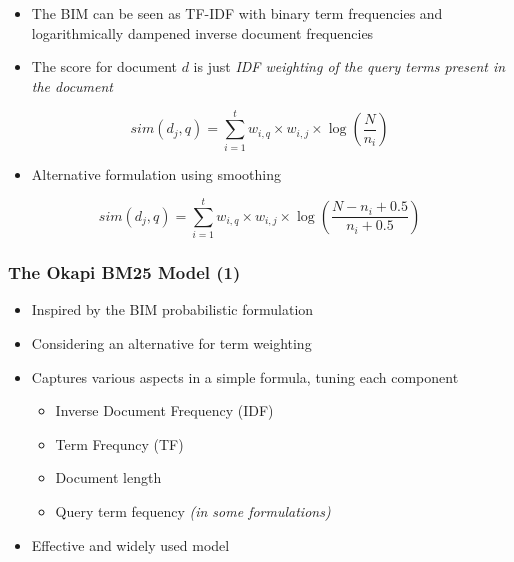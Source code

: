 \documentclass[svgnames]{beamer}
\begin{document}
\begin{frame}[allowframebreaks]
  \begin{block}{}
    \begin{itemize}
    \item The BIM can be seen as TF-IDF with binary term frequencies and logarithmically dampened inverse document frequencies
    \item The score for document $d$ is just \emph{IDF weighting of the query terms present in the document}
    \end{itemize}
	\begin{displaymath}  
	sim(d_j,q) = \sum_{i=1}^t w_{i,q} \times w_{i,j} \times \log \left( \frac{N}{n_i} \right)
	\end{displaymath}
    \begin{itemize}
    \item Alternative formulation using smoothing
    \end{itemize}
	\begin{displaymath}  
	sim(d_j,q) = \sum_{i=1}^t w_{i,q} \times w_{i,j} \times \log \left( \frac{N - n_i + 0.5}{n_i + 0.5} \right)
	\end{displaymath}
   \end{block}
\end{frame}

\begin{frame} \frametitle{The Okapi BM25 Model (1)}
\begin{itemize}
\item Inspired by the BIM probabilistic formulation
\item Considering an alternative for term weighting
\item Captures various aspects in a simple formula, tuning each component
    \begin{itemize}
    \item Inverse Document Frequency (IDF)
    \item Term Frequncy (TF)
    \item Document length 
    \item Query term fequency {\it (in some formulations)}
    \end{itemize}
\item Effective and widely used model
\end{itemize}
\end{frame}
\end{document}
